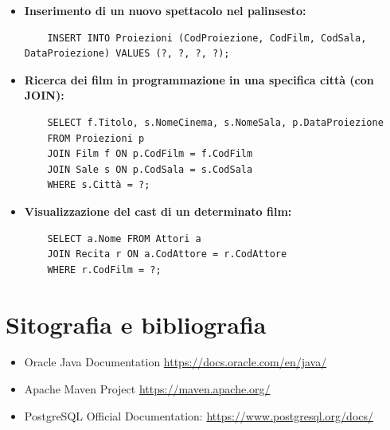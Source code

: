 \documentclass{article}
\begin{document}
\begin{itemize}
    \item \textbf{Inserimento di un nuovo spettacolo nel palinsesto:}
    \begin{verbatim}
    INSERT INTO Proiezioni (CodProiezione, CodFilm, CodSala, DataProiezione) VALUES (?, ?, ?, ?);
    \end{verbatim}
    
    \item \textbf{Ricerca dei film in programmazione in una specifica città (con JOIN):}
    \begin{verbatim}
    SELECT f.Titolo, s.NomeCinema, s.NomeSala, p.DataProiezione 
    FROM Proiezioni p
    JOIN Film f ON p.CodFilm = f.CodFilm
    JOIN Sale s ON p.CodSala = s.CodSala
    WHERE s.Città = ?;
    \end{verbatim}
    
    \item \textbf{Visualizzazione del cast di un determinato film:}
    \begin{verbatim}
    SELECT a.Nome FROM Attori a
    JOIN Recita r ON a.CodAttore = r.CodAttore
    WHERE r.CodFilm = ?;
    \end{verbatim}
\end{itemize}

\section{Sitografia e bibliografia}
\begin{itemize}
    \item Oracle Java Documentation \url {https://docs.oracle.com/en/java/}
    \item Apache Maven Project \url{https://maven.apache.org/}
    \item PostgreSQL Official Documentation: \url{https://www.postgresql.org/docs/}
\end{itemize}
\end{document}
